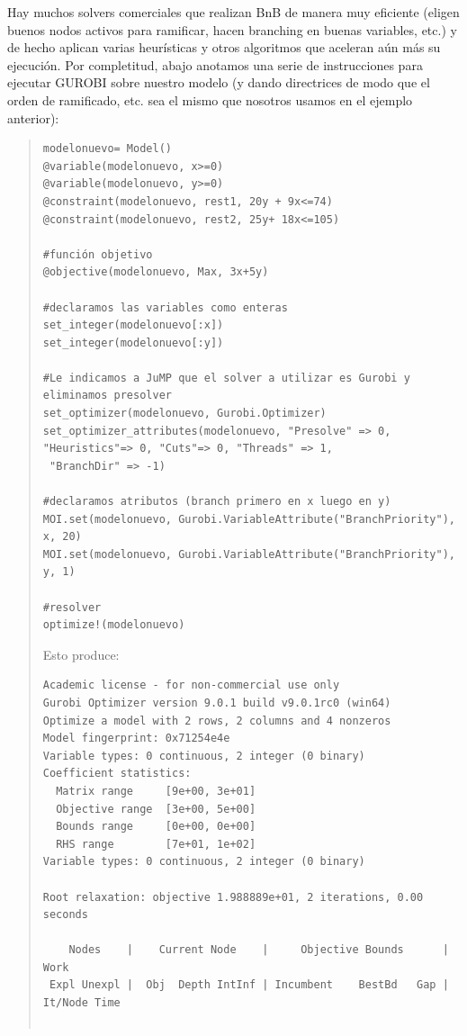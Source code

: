     
Hay muchos solvers comerciales que realizan BnB de manera muy eficiente (eligen buenos nodos activos para ramificar, hacen branching en buenas variables, etc.) y de hecho aplican varias heurísticas y otros algoritmos que aceleran aún más su ejecución. Por completitud, abajo anotamos una serie de instrucciones para ejecutar GUROBI sobre nuestro modelo (y dando directrices de modo que el orden de ramificado, etc. sea el mismo que nosotros usamos en el ejemplo anterior):

    
    	\begin{quote}
    		\begin{lstlisting}
modelonuevo= Model()
@variable(modelonuevo, x>=0)
@variable(modelonuevo, y>=0)
@constraint(modelonuevo, rest1, 20y + 9x<=74)
@constraint(modelonuevo, rest2, 25y+ 18x<=105)

#función objetivo
@objective(modelonuevo, Max, 3x+5y)

#declaramos las variables como enteras
set_integer(modelonuevo[:x])
set_integer(modelonuevo[:y])

#Le indicamos a JuMP que el solver a utilizar es Gurobi y eliminamos presolver
set_optimizer(modelonuevo, Gurobi.Optimizer)
set_optimizer_attributes(modelonuevo, "Presolve" => 0, "Heuristics"=> 0, "Cuts"=> 0, "Threads" => 1,
 "BranchDir" => -1) 

#declaramos atributos (branch primero en x luego en y)
MOI.set(modelonuevo, Gurobi.VariableAttribute("BranchPriority"), x, 20)  
MOI.set(modelonuevo, Gurobi.VariableAttribute("BranchPriority"), y, 1)  

#resolver
optimize!(modelonuevo)
\end{lstlisting}
\vspace{-10pt}
Esto produce:
\vspace{-10pt}
\begin{lstlisting}[backgroundcolor=\color{light_gray}]
Academic license - for non-commercial use only
Gurobi Optimizer version 9.0.1 build v9.0.1rc0 (win64)
Optimize a model with 2 rows, 2 columns and 4 nonzeros
Model fingerprint: 0x71254e4e
Variable types: 0 continuous, 2 integer (0 binary)
Coefficient statistics:
  Matrix range     [9e+00, 3e+01]
  Objective range  [3e+00, 5e+00]
  Bounds range     [0e+00, 0e+00]
  RHS range        [7e+01, 1e+02]
Variable types: 0 continuous, 2 integer (0 binary)

Root relaxation: objective 1.988889e+01, 2 iterations, 0.00 seconds

    Nodes    |    Current Node    |     Objective Bounds      |     Work
 Expl Unexpl |  Obj  Depth IntInf | Incumbent    BestBd   Gap | It/Node Time


\end{lstlisting}
\end{quote}

